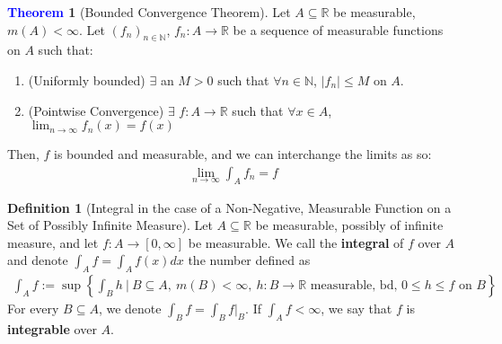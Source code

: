 \documentclass[reqno,11pt]{amsart}
\theoremstyle{definition}
\newcommand{\bb}[1]{\mathbb{#1}}
\newcommand{\sets}[2]{ \left\{ #1\ |\ #2 \right\}}
\newtheorem{theorem}{\textcolor{blue}{Theorem}}
\theoremstyle{definition}
\newtheorem{definition}{\textcolor{OliveGreen}{Definition}}
\theoremstyle{remark}
\begin{document}
\begin{theorem}[Bounded Convergence Theorem]
	Let $A \subseteq \bb{R}$ be measurable, $m(A) < \infty$. Let $(f_n)_{n \in \bb{N}}$, $f_n: A \rightarrow \bb{R}$ be a sequence of measurable functions on $A$ such that: 
	\begin{enumerate}[noitemsep]
		\item (Uniformly bounded) $\exists$ an $M > 0$ such that $\forall n \in \bb{N}$, $|f_n| \leq M$ on $A$. 
		\item (Pointwise Convergence) $\exists$ $f: A \rightarrow \bb{R}$ such that $\forall x \in A$, $\lim_{n \rightarrow \infty} f_n(x) = f(x)$
	\end{enumerate}
	Then, $f$ is bounded and measurable, and we can interchange the limits as so: 
	\begin{align*}
		\lim_{n \rightarrow \infty} \int_A f_n = f	
	\end{align*}
\end{theorem}


\begin{definition}[Integral in the case of a Non-Negative, Measurable Function on a Set of Possibly Infinite Measure] 
	Let $A \subseteq \bb{R}$ be measurable, possibly of infinite measure, and let $f: A \rightarrow [0, \infty]$ be measurable. We call the \textbf{integral} of $f$ over $A$ and denote $\int_A f = \int_A f(x) dx$ the number defined as 
	\begin{align}
		\int_A f := \sup \sets{\int_B h}{B \subseteq A,\ m(B) < \infty,\ h: B \rightarrow \bb{R} \mbox{ measurable, bd, } 0 \leq h \leq f \mbox{ on } B}
	\end{align}
	For every $B \subseteq A$, we denote $\int_B f = \int_B f|_B$. If $\int_A f < \infty$, we say that $f$ is \textbf{integrable} over $A$. 
\end{definition}
\end{document}
